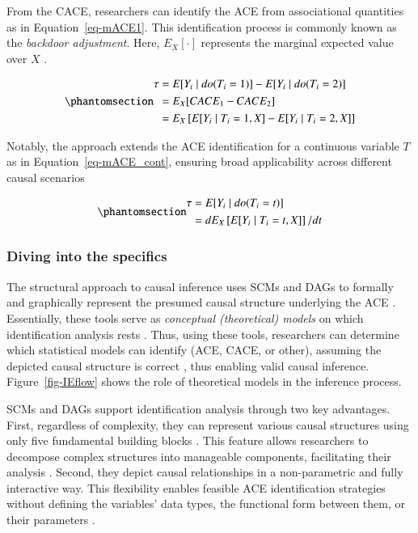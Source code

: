 \documentclass[
  authoryear,
  review,
  1p]{elsarticle}
\begin{document}
From the CACE, researchers can identify the ACE from associational
quantities as in Equation~\ref{eq-mACE1}. This identification process is
commonly known as the \emph{backdoor adjustment}. Here, \(E_{X}[\cdot]\)
represents the marginal expected value over \(X\)
\citep{Morgan_et_al_2014}.

\begin{equation}\phantomsection\label{eq-mACE1}{
\begin{aligned}
  \tau & = E[Y_{i} \mid do(T_{i}=1)]- E[Y_{i} \mid do(T_{i}=2)] \\
  & = E_{X}[CACE_{1} - CACE_{2}] \\
  & = E_{X}\left[ E[Y_{i} \mid T_{i}=1, X] - E[Y_{i} \mid T_{i}=2, X] \right]
\end{aligned}
}\end{equation}

Notably, the approach extends the ACE identification for a continuous
variable \(T\) as in Equation~\ref{eq-mACE_cont}, ensuring broad
applicability across different causal scenarios
\citep[pp.~45]{Neal_2020}

\begin{equation}\phantomsection\label{eq-mACE_cont}{
\begin{aligned}
  \tau &= E[Y_{i} \mid do(T_{i}=t)] \\
  & = d E_{X}\left[ E[Y_{i} \mid T_{i}=t, X]\right]/ dt
  \end{aligned}
}\end{equation}

\subsubsection{Diving into the specifics}\label{sec-appendixB3}

The structural approach to causal inference uses SCMs and DAGs to
formally and graphically represent the presumed causal structure
underlying the ACE
\citep{Pearl_2009, Pearl_et_al_2016, Gross_et_al_2018, Neal_2020}.
Essentially, these tools serve as \emph{conceptual (theoretical) models}
on which identification analysis rests
\citep[pp.~4]{Schuessler_et_al_2023}. Thus, using these tools,
researchers can determine which statistical models can identify (ACE,
CACE, or other), assuming the depicted causal structure is correct
\citep{McElreath_2020}, thus enabling valid causal inference.
Figure~\ref{fig-IEflow} shows the role of theoretical models in the
inference process.

SCMs and DAGs support identification analysis through two key
advantages. First, regardless of complexity, they can represent various
causal structures using only five fundamental building blocks
\citep{Neal_2020, McElreath_2020}. This feature allows researchers to
decompose complex structures into manageable components, facilitating
their analysis \citep{McElreath_2020}. Second, they depict causal
relationships in a non-parametric and fully interactive way. This
flexibility enables feasible ACE identification strategies without
defining the variables' data types, the functional form between them, or
their parameters \citep[pp.~35]{Pearl_et_al_2016}.
\end{document}
